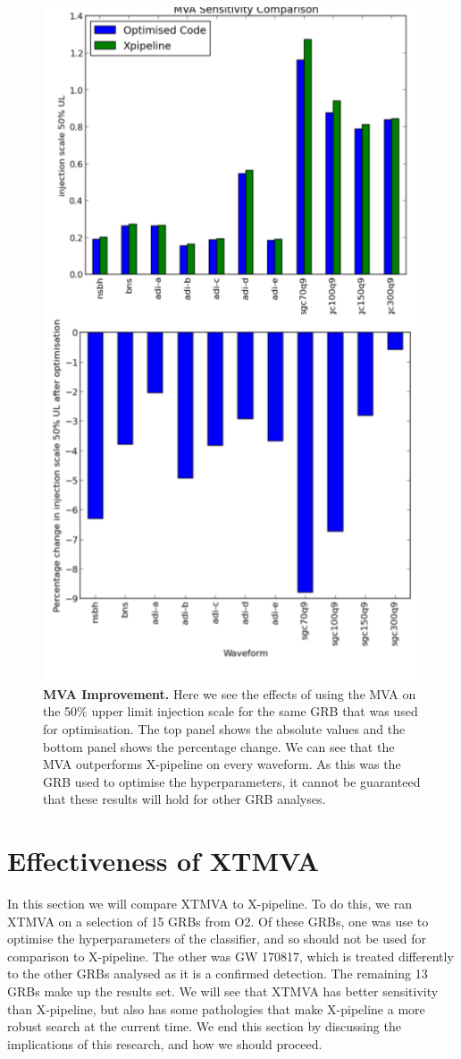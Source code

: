 \documentclass[11pt]{cuthesis}
\newcommand{\xp}{X-pipeline }
\newcommand{\xpc}{X-pipeline, }
\newcommand{\xpfs}{X-pipeline. }
\begin{document}
\begin{figure} %
\begin{center}
\includegraphics[width=0.8\linewidth]{x_compare.png}
\end{center}
\caption{\textbf{MVA Improvement.} Here we see the effects of using the MVA on the 50\% upper limit injection scale for the same GRB that was used for optimisation. The top panel shows the absolute values and the bottom panel shows the percentage change. We can see that the MVA outperforms \xp on every waveform. As this was the GRB used to optimise the hyperparameters, it cannot be guaranteed that these results will hold for other GRB analyses. }
\label{fig:x compare}
\end{figure}

\section{Effectiveness of XTMVA}
In this section we will compare XTMVA to \xpfs To do this, we ran XTMVA on a selection of 15 GRBs from O2. Of these GRBs, one was use to optimise the hyperparameters of the classifier, and so should not be used for comparison to \xpfs The other was GW 170817, which is treated differently to the other GRBs analysed as it is a confirmed detection. The remaining 13 GRBs make up the results set. We will see that XTMVA has better sensitivity than \xpc but also has some pathologies that make \xp a more robust search at the current time. We end this section by discussing the implications of this research, and how we should proceed. 
\end{document}
